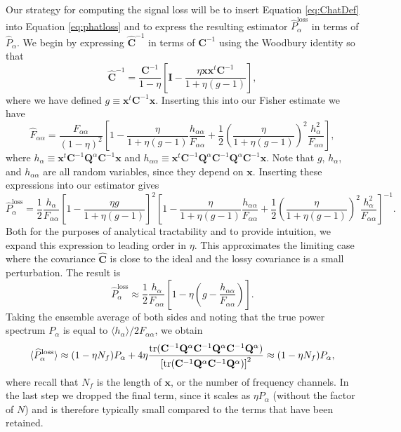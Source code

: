 \documentclass[preprint2,numberedappendix,tighten]{aastex6}  %
\newcommand{\x}{\mathbf{x}}
\newcommand{\C}{\mathbf{C}}
\newcommand{\Chat}{\mathbf{\widehat{C}}}
\newcommand{\Q}{\mathbf{Q}}
\newcommand{\I}{\mathbf{I}}
\begin{document}
Our strategy for computing the signal loss will be to insert Equation \eqref{eq:ChatDef} into Equation \eqref{eq:phatloss} and to express the resulting estimator $\widehat{P}_\alpha^\textrm{loss}$ in terms of $\widehat{P}_\alpha$. We begin by expressing $\Chat^{-1}$ in terms of $\C^{-1}$ using the Woodbury identity so that
\begin{equation}
\Chat^{-1} = \frac{\C^{-1}}{1-\eta} \left[ \I - \frac{\eta \x \x^t \C^{-1}}{1+ \eta (g-1)}\right],
\end{equation}
where we have defined $g \equiv \x^t \C^{-1} \x$. Inserting this into our Fisher estimate we have
\begin{equation}
\widehat{F}_{\alpha \alpha} = \frac{F_{\alpha \alpha}}{(1-\eta)^2} \left[ 1 -\frac{\eta }{1+ \eta (g-1)} \frac{h_{\alpha \alpha}}{F_{\alpha \alpha}} + \frac{1}{2} \left( \frac{\eta }{1+ \eta (g-1)} \right)^2 \frac{h_\alpha^2}{F_{\alpha \alpha}}\right],
\end{equation}
where $h_\alpha \equiv \x^t \C^{-1} \Q^\alpha \C^{-1} \x $ and $h_{\alpha \alpha} \equiv \x^t \C^{-1} \Q^\alpha \C^{-1} \Q^\alpha \C^{-1}\x $. Note that $g$, $h_\alpha$, and $h_{\alpha \alpha}$ are all random variables, since they depend on $\x$. Inserting these expressions into our estimator gives
\begin{equation}
\label{eq:phatlossexpanded}
\widehat{P}_\alpha^\textrm{loss} = \frac{1}{2} \frac{h_\alpha}{F_{\alpha \alpha}} \left[ 1 - \frac{\eta g}{1+ \eta (g-1)}\right]^2  \left[ 1 -\frac{\eta }{1+ \eta (g-1)} \frac{h_{\alpha \alpha}}{F_{\alpha \alpha}} + \frac{1}{2} \left( \frac{\eta }{1+ \eta (g-1)} \right)^2 \frac{h_\alpha^2}{F_{\alpha \alpha}}\right]^{-1}.
\end{equation}
Both for the purposes of analytical tractability and to provide intuition, we expand this expression to leading 
order in $\eta$. This approximates the limiting case where the covariance $\Chat$ is close to the ideal and the 
lossy covariance is a small perturbation.  The result is
\begin{equation}
\widehat{P}_\alpha^\textrm{loss} \approx \frac{1}{2} \frac{h_\alpha}{F_{\alpha \alpha}} \left[ 1 - \eta \left( g - \frac{h_{\alpha \alpha}}{F_{\alpha \alpha}}\right)\right].
\end{equation}
Taking the ensemble average of both sides and noting that the true power spectrum $P_\alpha$ is equal to $\langle h_\alpha \rangle / 2 F_{\alpha \alpha}$, we obtain
\begin{equation}
\langle \widehat{P}_\alpha^\textrm{loss} \rangle \approx (1- \eta N_f) P_\alpha + 4 \eta \frac{\rm{tr} (\C^{-1} \Q^\alpha \C^{-1} \Q^\alpha \C^{-1} \Q^\alpha )}{\left[ \rm{tr} (\C^{-1} \Q^\alpha \C^{-1} \Q^\alpha  ) \right]^2} \approx (1- \eta N_f) P_\alpha,
\end{equation}
where recall that $N_f$ is the length of $\x$, or the number of frequency channels. In the last step we dropped the final term, since it scales as $\eta P_\alpha$ (without the factor of $N$) and is therefore typically small compared to the terms that have been retained.
\end{document}
